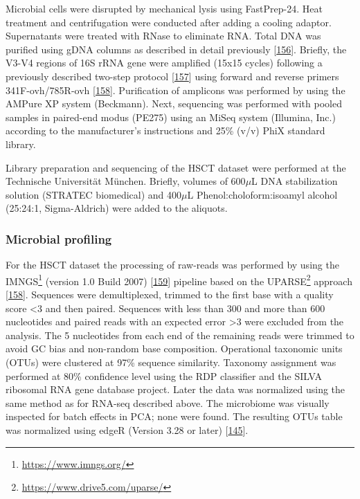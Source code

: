 \documentclass[
  a4paper,
]{book}
\DeclareRobustCommand{\href}[2]{#2\footnote{\url{#1}}}
\begin{document}
Microbial cells were disrupted by mechanical lysis using FastPrep-24.
Heat treatment and centrifugation were conducted after adding a cooling adaptor.
Supernatants were treated with RNase to eliminate RNA.
Total DNA was purified using gDNA columns as described in detail previously {[}\protect\hyperlink{ref-berry2011}{156}{]}.
Briefly, the V3-V4 regions of 16S rRNA gene were amplified (15x15 cycles) following a previously described two-step protocol {[}\protect\hyperlink{ref-klindworth2013}{157}{]} using forward and reverse primers 341F-ovh/785R-ovh {[}\protect\hyperlink{ref-edgar2013}{158}{]}.
Purification of amplicons was performed by using the AMPure XP system (Beckmann).
Next, sequencing was performed with pooled samples in paired-end modus (PE275) using an MiSeq system (Illumina, Inc.) according to the manufacturer's instructions and 25\% (v/v) PhiX standard library.

Library preparation and sequencing of the HSCT dataset were performed at the Technische Universität München.
Briefly, volumes of 600\(\mu\)L DNA stabilization solution (STRATEC biomedical) and 400\(\mu\)L Phenol:choloform:isoamyl alcohol (25:24:1, Sigma-Aldrich) were added to the aliquots.

\hypertarget{microbial-profiling}{%
\subsubsection{Microbial profiling}\label{microbial-profiling}}

For the HSCT dataset the processing of raw-reads was performed by using the \href{https://www.imngs.org/}{IMNGS} (version 1.0 Build 2007) {[}\protect\hyperlink{ref-lagkouvardos2016}{159}{]} pipeline based on the \href{https://www.drive5.com/uparse/}{UPARSE} approach {[}\protect\hyperlink{ref-edgar2013}{158}{]}.
Sequences were demultiplexed, trimmed to the first base with a quality score \textless3 and then paired.
Sequences with less than 300 and more than 600 nucleotides and paired reads with an expected error \textgreater3 were excluded from the analysis.
The 5 nucleotides from each end of the remaining reads were trimmed to avoid GC bias and non-random base composition.
Operational taxonomic units (OTUs) were clustered at 97\% sequence similarity.
Taxonomy assignment was performed at 80\% confidence level using the RDP classifier and the SILVA ribosomal RNA gene database project.
Later the data was normalized using the same method as for RNA-seq described above.
The microbiome was visually inspected for batch effects in PCA; none were found.
The resulting OTUs table was normalized using edgeR (Version 3.28 or later) {[}\protect\hyperlink{ref-mccarthy2012}{145}{]}.
\end{document}
